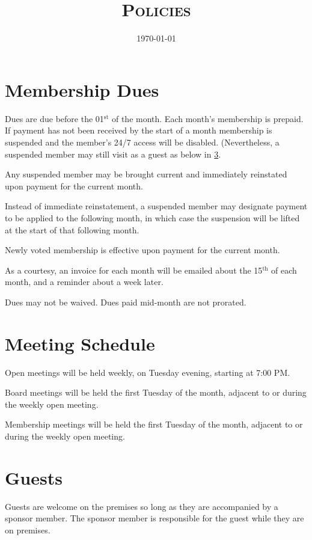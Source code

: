 \documentclass[10pt,letterpaper,titlepage]{article}
\title{%
    \textsc{\LARGE \corpname \\
    \Large Policies
    }
}
\date{\today}
\author{}
\newcommand{\superscript}[1]{\ensuremath{^{\textrm{#1}}}}
\renewcommand{\th}[0]{\superscript{th}}
\newcommand{\st}[0]{\superscript{st}}
\begin{document}
\maketitle

\tableofcontents
\newpage

\section{Membership Dues}
\label{dues}

Dues are due before the 01\st{} of the month. Each month's membership is
prepaid. If payment has not been received by the start of a month membership
is suspended and the member's 24/7 access will be disabled. (Nevertheless, a
suspended member may still visit as a guest as below in \ref{guests}.

Any suspended member may be brought current and immediately reinstated upon
payment for the current month.

Instead of immediate reinstatement, a suspended member may designate payment to
be applied to the following month, in which case the suspension will be lifted
at the start of that following month.

Newly voted membership is effective upon payment for the current month.

As a courtesy, an invoice for each month will be emailed about the 15\th{}
of each month, and a reminder about a week later.

Dues may not be waived. Dues paid mid-month are not prorated.

\section{Meeting Schedule}

Open meetings will be held weekly, on Tuesday evening, starting at 7:00 PM.

Board meetings will be held the first Tuesday of the month, adjacent
to or during the weekly open meeting.

Membership meetings will be held the first Tuesday of the month,
adjacent to or during the weekly open meeting.

\section{Guests}
\label{guests}
Guests are welcome on the premises so long as they are accompanied by a sponsor
member. The sponsor member is responsible for the guest while they are on
premises.
\end{document}
